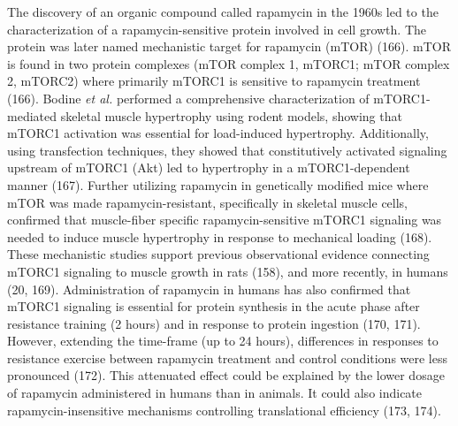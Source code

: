 \documentclass[twoside,10pt]{gihclass} %
\begin{document}
The discovery of an organic compound called rapamycin in the 1960s led to the characterization of a rapamycin-sensitive protein involved in cell growth. The protein was later named mechanistic target for rapamycin (mTOR)
(166).
mTOR is found in two protein complexes (mTOR complex 1, mTORC1; mTOR complex 2, mTORC2) where primarily mTORC1 is sensitive to rapamycin treatment
(166).
Bodine \emph{et al.} performed a comprehensive characterization of mTORC1-mediated skeletal muscle hypertrophy using rodent models, showing that mTORC1 activation was essential for load-induced hypertrophy. Additionally, using transfection techniques, they showed that constitutively activated signaling upstream of mTORC1 (Akt) led to hypertrophy in a mTORC1-dependent manner
(167).
Further utilizing rapamycin in genetically modified mice where mTOR was made rapamycin-resistant, specifically in skeletal muscle cells, confirmed that muscle-fiber specific rapamycin-sensitive mTORC1 signaling was needed to induce muscle hypertrophy in response to mechanical loading
(168).
These mechanistic studies support previous observational evidence connecting mTORC1 signaling to muscle growth in rats
(158),
and more recently, in humans
(20, 169).
Administration of rapamycin in humans has also confirmed that mTORC1 signaling is essential for protein synthesis in the acute phase after resistance training (2 hours) and in response to protein ingestion
(170, 171).
However, extending the time-frame (up to 24 hours), differences in responses to resistance exercise between rapamycin treatment and control conditions were less pronounced
(172).
This attenuated effect could be explained by the lower dosage of rapamycin administered in humans than in animals.
It could also indicate rapamycin-insensitive mechanisms controlling translational efficiency
(173, 174).
\end{document}
